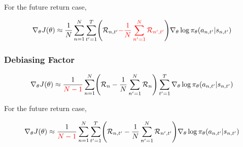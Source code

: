 \documentclass{article}
\begin{document}
For the future return case,

\begin{eqnarray}
\nabla_\theta J(\theta)
\approx \frac{1}{N} \sum_{n=1}^{N} \sum_{t^\prime=1}^{T} \Biggl(\mathcal{R}_{n, t^\prime} {\color{red}{- \frac{1}{N} \sum_{n^\prime=1}^N \mathcal{R}_{n^\prime, t^\prime} }} \Biggr)  \nabla_\theta \log \pi_\theta (a_{n, t^\prime}|s_{n, t^\prime})
\end{eqnarray}

\subsubsection{Debiasing Factor}

\begin{eqnarray}
\nabla_\theta J(\theta)
\approx \frac{1}{{\color{red}{N-1}}} \sum_{n=1}^{N} \Biggl(\mathcal{R}_n - \frac{1}{N} \sum_{n^\prime=1}^N \mathcal{R}_n \Biggr)\sum_{t^\prime=1}^{T} \nabla_\theta \log \pi_\theta (a_{n, t^\prime}|s_{n, t^\prime})
\end{eqnarray}

For the future return case,

\begin{eqnarray}
\nabla_\theta J(\theta)
\approx \frac{1}{{\color{red}{N-1}}} \sum_{n=1}^{N} \sum_{t^\prime=1}^{T} \Biggl(\mathcal{R}_{n, t^\prime} - \frac{1}{N} \sum_{n^\prime=1}^N \mathcal{R}_{n^\prime, t^\prime} \Biggr)  \nabla_\theta \log \pi_\theta (a_{n, t^\prime}|s_{n, t^\prime})
\end{eqnarray}




\end{document}
